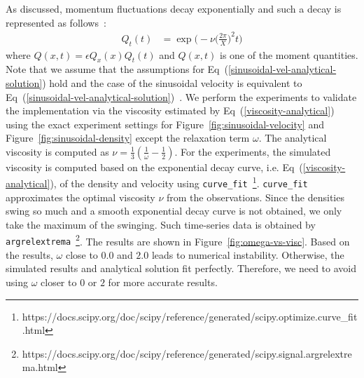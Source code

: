 As discussed, momentum fluctuations decay exponentially and
such a decay is represented as follows~\cite{palmer1994transverse, hess2002determining}:
\begin{equation}
  \begin{aligned}
    Q_t(t) &= \exp\biggl(
      -\nu \biggl(
        \frac{2\pi}{X}
      \biggr)^2 t\biggr)
  \end{aligned}
  \label{viscosity-analytical}
\end{equation}
where $Q(x, t) = \epsilon Q_x(x) Q_t(t)$
and $Q(x, t)$ is one of the moment quantities.
Note that we assume that the assumptions for Eq~(\ref{sinusoidal-vel-analytical-solution}) hold
and the case of the sinusoidal velocity is equivalent to Eq~(\ref{sinusoidal-vel-analytical-solution})~\cite{fei2018three}.
We perform the experiments to validate the implementation via the viscosity estimated by Eq~(\ref{viscosity-analytical}) using
the exact experiment settings for Figure~\ref{fig:sinusoidal-velocity}
and Figure~\ref{fig:sinusoidal-density}
except the relaxation term $\omega$.
The analytical viscosity is computed as $\nu = \frac{1}{3} (\frac{1}{\omega} - \frac{1}{2})$.
For the experiments, the simulated viscosity is computed based on the exponential decay curve, i.e. Eq~(\ref{viscosity-analytical}),
of the density and velocity using 
{\tt curve\_fit}~\footnote{https://docs.scipy.org/doc/scipy/reference/generated/scipy.optimize.curve\_fit.html}.
{\tt curve\_fit} approximates the optimal viscosity $\nu$ from the observations.
Since the densities swing so much and a smooth exponential decay curve
is not obtained, we only take the maximum of the swinging.
Such time-series data is obtained by
{\tt argrelextrema}~\footnote{https://docs.scipy.org/doc/scipy/reference/generated/scipy.signal.argrelextrema.html}.
The results are shown in Figure~\ref{fig:omega-vs-visc}.
Based on the results, $\omega$ close to $0.0$ and $2.0$
leads to numerical instability.
Otherwise, the simulated results and analytical solution fit perfectly.
Therefore, we need to avoid using $\omega$ closer to $0$ or $2$ for more accurate results.

